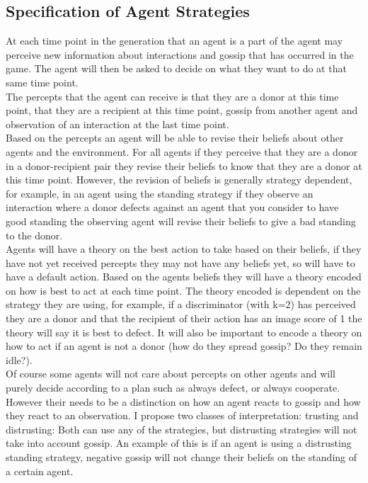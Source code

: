 \documentclass[twoside,twocolumn]{article}
\begin{document}
\subsection{Specification of Agent Strategies}
At each time point in the generation that an agent is a part of the agent may perceive new information about interactions and gossip that has occurred in the game. The agent will then be asked to decide on what they want to do at that same time point.\\
The percepts that the agent can receive is that they are a donor at this time point, that they are a recipient at this time point, gossip from another agent and observation of an interaction at the last time point.\\
Based on the percepts an agent will be able to revise their beliefs about other agents and the environment. For all agents if they perceive that they are a donor in a donor-recipient pair they revise their beliefs to know that they are a donor at this time point. However, the revision of beliefs is generally strategy dependent, for example, in an agent using the standing strategy if they observe an interaction where a donor defects against an agent that you consider to have good standing the observing agent will revise their beliefs to give a bad standing to the donor.\\
Agents will have a theory on the best action to take based on their beliefs, if they have not yet received percepts they may not have any beliefs yet, so will have to have a default action. Based on the agents beliefs they will have a theory encoded on how is best to act at each time point. The theory encoded is dependent on the strategy they are using, for example, if a discriminator (with k=2) has perceived they are a donor and that the recipient of their action has an image score of 1 the theory will say it is best to defect. It will also be important to encode a theory on how to act if an agent is not a donor (how do they spread gossip? Do they remain idle?).\\
Of course some agents will not care about percepts on other agents and will purely decide according to a plan such as always defect, or always cooperate. However their needs to be a distinction on how an agent reacts to gossip and how they react to an observation. I propose two classes of interpretation: trusting and distrusting: Both can use any of the strategies, but distrusting strategies will not take into account gossip. An example of this is if an agent is using a distrusting standing strategy, negative gossip will not change their beliefs on the standing of a certain agent.\\
\end{document}
